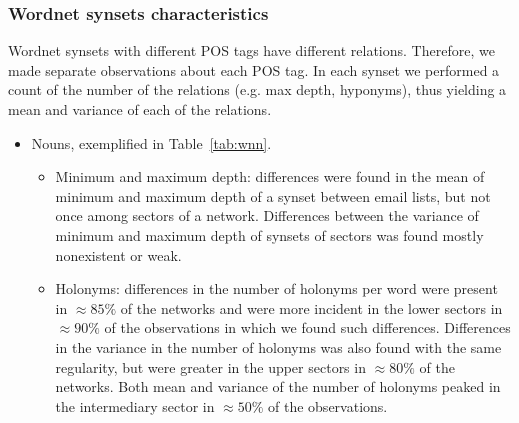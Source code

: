 																																																\subsubsection{Wordnet synsets characteristics}\label{subsec:wn1}
																																																Wordnet synsets with different POS tags have different relations.
																																																Therefore, we made separate observations about each POS tag.
																																																In each synset we performed a count of the number of the relations (e.g. max depth, hyponyms),
																																																thus yielding a mean and variance of each of the relations.
																																																\begin{itemize}
																																																	\item Nouns, exemplified in Table~\ref{tab:wnn}.
																																																			\begin{itemize}
																																																						\item Minimum and maximum depth: 
																																																										differences were found in the mean of minimum and maximum depth of a synset between email lists,
																																																												but not once among sectors of a network.
																																																														Differences between the variance of minimum and maximum depth of synsets of sectors was found mostly nonexistent or weak.
																																																																	\item Holonyms:
																																																																					differences in the number of holonyms per word were present in $\approx 85\%$ of the networks and were
																																																																							more incident in the lower sectors in $\approx 90\%$ of the observations in which we found such differences.
																																																																									Differences in the variance in the number of holonyms was also found with the same regularity,
																																																																											but were greater in the upper sectors in $\approx 80\%$ of the networks.
																																																																															Both mean and variance of the number of holonyms peaked in the intermediary sector in $\approx50\%$ of the observations.

\end{itemize}
\end{itemize}
